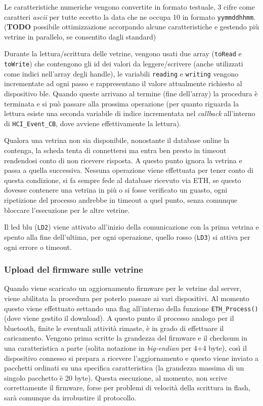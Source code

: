 Le caratteristiche numeriche vengono convertite in formato testuale, 3 cifre come caratteri \textit{ascii} per tutte eccetto la data che ne occupa 10 in formato \texttt{yymmddhhmm}. (\textbf{TODO} possibile ottimizzazione accorpando alcune caratteristiche e gestendo pi\`u vetrine in parallelo, se consentito dagli standard)

Durante la lettura/scrittura delle vetrine, vengono usati due array (\texttt{toRead} e \texttt{toWrite}) che contengono gli id dei valori da leggere/scrivere (anche utilizzati come indici nell'array degli handle), le variabili \texttt{reading} e \texttt{writing} vengono incrementate ad ogni passo e rappresentano il valore attualmente richiesto al dispositivo ble. Quando queste arrivano al termine (fine dell'array) la procedura \`e terminata e si pu\`o passare alla prossima operazione (per quanto riguarda la lettura esiste una seconda variabile di indice incrementata nel \textit{callback} all'interno di \texttt{HCI\_Event\_CB}, dove avviene effettivamente la lettura).

Qualora una vetrina non sia disponibile, nonostante il database online la contenga, la scheda tenta di connettersi ma entra ben presto in timeout rendendosi conto di non ricevere risposta. A questo punto ignora la vetrina e passa a quella successiva. Nessuna operazione viene effettuata per tener conto di questa condizione, si fa sempre fede al database ricevuto via ETH, se questo dovesse contenere una vetrina in pi\`u o si fosse verificato un guasto, ogni ripetizione del processo andrebbe in timeout a quel punto, senza comunque bloccare l'esecuzione per le altre vetrine.

Il led blu (\texttt{LD2}) viene attivato all'inizio della comunicazione con la prima vetrina e spento alla fine dell'ultima, per ogni operazione, quello rosso (\texttt{LD3}) si attiva per ogni errore o timeout.

\subsubsection{Upload del firmware sulle vetrine}

Quando viene scaricato un aggiornamento firmware per le vetrine dal server, viene abilitata la procedura per poterlo passare ai vari dispositivi. Al momento questo viene effettuato settando una flag all'interno della funzione \texttt{ETH\_Process()} (dove viene gestito il download). A questo punto il processo analogo per il bluetooth, finite le eventuali attivit\`a rimaste, \`e in grado di effettuare il caricamento. Vengono prima scritte la grandezza del firmware e il checksum in una caratteristica a parte (solita notazione in \textit{big-endian} per 4+4 byte), cos\`i il dispositivo connesso si prepara a ricevere l'aggiornamento e questo viene inviato a pacchetti ordinati su una specifica caratteristica (la grandezza massima di un singolo pacchetto \`e 20 byte). Questa esecuzione, al momento, non scrive correttamente il firmware, forse per problemi di velocit\`a della scrittura in flash, sar\`a comunque da irrobustire il protocollo.

